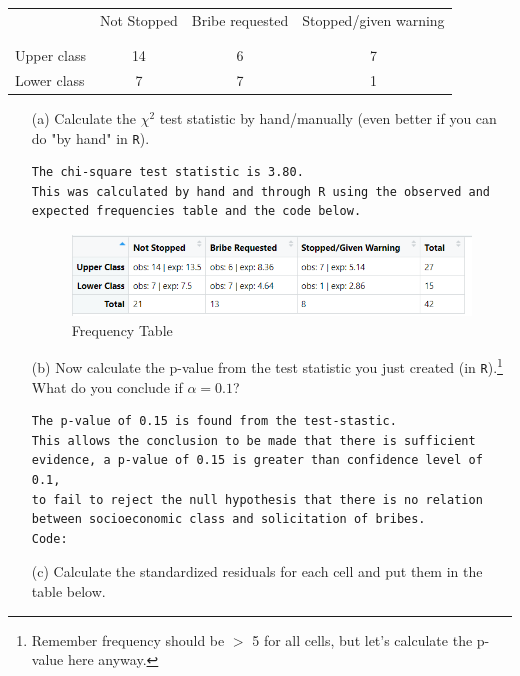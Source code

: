 \documentclass[12pt,letterpaper]{article}
\begin{document}
\newpage
\begin{table}[h!]
	\centering
	\begin{tabular}{l | c c c }
		& Not Stopped & Bribe requested & Stopped/given warning \\
		\\[-1.8ex] 
		\hline \\[-1.8ex]
		Upper class & 14 & 6 & 7 \\
		Lower class & 7 & 7 & 1 \\
		\hline
	\end{tabular}
\end{table}
\begin{enumerate}
	\item [(a)]
	Calculate the $\chi^2$ test statistic by hand/manually (even better if you can do "by hand" in \texttt{R}).
\begin{Verbatim}
The chi-square test statistic is 3.80. 
This was calculated by hand and through R using the observed and 
expected frequencies table and the code below.
\end{Verbatim}
\begin{figure}[h!]\centering
	\caption{\footnotesize Frequency Table}
	\label{fig:Table 1}
	\includegraphics[width=.85\textwidth]{frequencies.png}
\end{figure}
  
	
	\item [(b)]
	Now calculate the p-value from the test statistic you just created (in \texttt{R}).\footnote{Remember frequency should be $>$ 5 for all cells, but let's calculate the p-value here anyway.}  What do you conclude if $\alpha = 0.1$?\\
\begin{Verbatim}
The p-value of 0.15 is found from the test-stastic. 
This allows the conclusion to be made that there is sufficient 
evidence, a p-value of 0.15 is greater than confidence level of 0.1, 
to fail to reject the null hypothesis that there is no relation 
between socioeconomic class and solicitation of bribes. 
Code:
\end{Verbatim}
  
	\item [(c)] Calculate the standardized residuals for each cell and put them in the table below.
	\vspace{1cm}
	

\end{enumerate}
\end{document}
